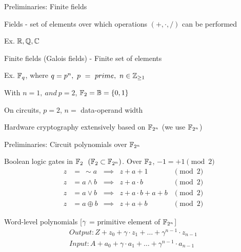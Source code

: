 \begin{frame}{\large Preliminaries: Finite fields}
\bi
	\item Fields - set of elements over which operations $(+,\cdot,/)$ can be performed 
	\bi
		\item Ex. ${\mathbb{R}},{\mathbb{Q}},{\mathbb{C}}$
	\ei
	\pause
	\vspace{0.1in}
	\item Finite fields (Galois fields) - Finite set of elements
	\bi
		\item Ex. ${\mathbb{F}}_q$, where $q=p^n,~p~=~prime,~n \in {\mathbb{Z}}_{\geq 1}$ 
		\bi
		\item With $n=1,~and~p=2$, ${\mathbb{F}}_2 = {\mathbb{B}} = \{0,1\}$
		\ei
		\item On circuits, $p=2$, $n=$ data-operand width
	\ei
	\pause
	\vspace{0.1in}
	\item Hardware cryptography extensively based on ${\mathbb{F}}_{2^n}$ (we use ${\mathbb{F}}_{2^n}$)
\ei
\end{frame}

\begin{frame}{\large Preliminaries: Circuit polynomials over ${\mathbb{F}}_{2^n}$}
\bi
	\item Boolean logic gates in ${\mathbb{F}}_2 ~~({\mathbb{F}}_2 \subset {\mathbb{F}}_{2^n})$. Over ${\mathbb{F}}_2$, $-1=+1\pmod{2}$
\ei
	\begin{align*}
		 z &=~ \sim a &\implies &z+a+1 &\pmod{2}\\
		 z &= a \wedge b &\implies &z+a\cdot b &\pmod{2}\\
		 z &= a \vee b &\implies &z+a\cdot b + a + b &\pmod{2}\\
		 z &= a \oplus b &\implies &z+a+b &\pmod{2}
	\end{align*}
\pause
\bi
	\item Word-level polynomials [$\gamma$ = primitive element of ${\mathbb{F}}_{2^n}$]
\ei
\begin{equation*}
\begin{split}
 Output:  Z + z_0 +\gamma \cdot  z_1 + \dots +\gamma^{n-1} \cdot z_{n-1}\\
 Input:  A + a_0 +\gamma \cdot a_1 + \dots +\gamma^{n-1} \cdot a_{n-1}
\end{split}
\end{equation*}
\end{frame}

